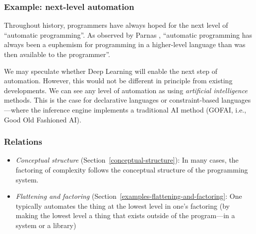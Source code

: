 \documentclass[english,submission]{programming}
\providecommand{\DIFaddbegin}{} %
\providecommand{\DIFaddend}{} %
\providecommand{\DIFdelbegin}{} %
\providecommand{\DIFdelend}{} %
\begin{document}
\hypertarget{example-next-level-automation}{%
\subsubsection{Example: next-level
automation}\label{example-next-level-automation}}

Throughout history, programmers have always hoped for the next level of
``automatic programming''. As observed by Parnas \cite{Euphemism},
``automatic programming has always been a euphemism for programming in a
higher-level language than was then available to the programmer''.

We may speculate whether Deep Learning will enable the next step of
automation. However, this would not be different in principle from
existing developments. We can see any level of automation as using
\emph{artificial intelligence} methods. This is the case for declarative
languages or constraint-based languages---where the inference engine
implements a traditional AI method (GOFAI, i.e., Good Old Fashioned AI).


\DIFdelbegin %
\DIFdelend \DIFaddbegin \hypertarget{relations-3}{%
\subsubsection{Relations}\label{relations-3}}
\DIFaddend 

\begin{itemize}
\tightlist
\item
  \emph{Conceptual structure} (Section~\ref{conceptual-structure}): In
  many cases, the factoring of complexity follows the conceptual
  structure of the programming system.
\item
  \emph{Flattening and factoring}
  (Section~\ref{examples-flattening-and-factoring}: One typically
  automates the thing at the lowest level in one's factoring (by making
  the lowest level a thing that exists outside of the program---in a
  system or a library)
\end{itemize}
\end{document}
